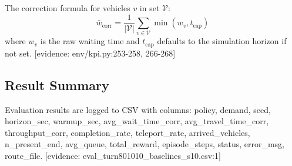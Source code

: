 The correction formula for vehicles $v$ in set $\mathcal{V}$:
\begin{equation}
\bar{w}_{\text{corr}} = \frac{1}{|\mathcal{V}|} \sum_{v \in \mathcal{V}} \min(w_v, t_{\text{cap}})
\end{equation}
where $w_v$ is the raw waiting time and $t_{\text{cap}}$ defaults to the simulation horizon if not set.
[evidence: env/kpi.py:253-258, 266-268]

\subsection{Result Summary}

Evaluation results are logged to CSV with columns: policy, demand, seed, horizon\_sec, warmup\_sec, avg\_wait\_time\_corr, avg\_travel\_time\_corr, throughput\_corr, completion\_rate, teleport\_rate, arrived\_vehicles, n\_present\_end, avg\_queue, total\_reward, episode\_steps, status, error\_msg, route\_file.
[evidence: eval\_turn801010\_baselines\_s10.csv:1]

